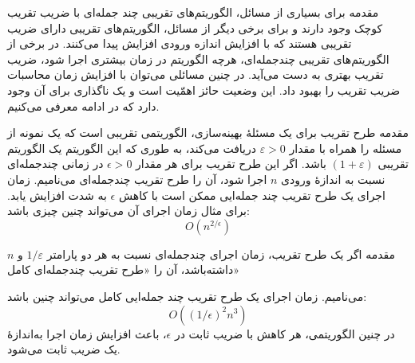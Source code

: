 \begin{itemframe}{مقدمه}
\itm
برای بسیاری از مسائل، الگوریتم‌های تقریبی چند جمله‌ای با ضریب تقریب کوچک وجود دارند و برای برخی دیگر از مسائل، الگوریتم‌های تقریبی دارای ضریب تقریبی هستند که با افزایش اندازه ورودی افزایش پیدا می‌کنند.
\itm
در برخی از الگوریتم‌های تقریبی چندجمله‌ای، هرچه الگوریتم در زمان بیشتری اجرا شود، ضریب تقریب بهتری به دست می‌آید. در چنین مسائلی می‌توان با افزایش زمان محاسبات ضریب تقریب را بهبود داد.
\itm
این وضعیت حائز اهمّیت است و یک ناگذاری برای آن وجود دارد که در ادامه معرفی می‌کنیم.
\end{itemframe}

\begin{itemframe}{مقدمه}
\itm
طرح تقریب
برای یک مسئلهٔ بهینه‌سازی، الگوریتمی تقریبی است که یک نمونه از مسئله را همراه با مقدار
$\varepsilon > 0$
دریافت می‌کند، به طوری که این الگوریتم یک الگوریتم تقریبی
$(1 + \varepsilon)$
 باشد.
\itm
اگر این طرح تقریب برای هر مقدار
$\epsilon > 0$
در زمانی چندجمله‌ای نسبت به اندازهٔ ورودی $n$ اجرا شود، آن را طرح تقریب چندجمله‌ای
 می‌نامیم.
\itm
زمان اجرای یک طرح تقریب چند جمله‌ایی ممکن است با کاهش
$\epsilon$
 به شدت افزایش یابد. برای مثال زمان اجرای آن می‌تواند چنین چیزی باشد:
$$
O(n^{2/\epsilon})
$$
\end{itemframe}


\begin{itemframe}{مقدمه}
\itm
اگر یک طرح تقریب، زمان اجرای چندجمله‌ای نسبت به هر دو پارامتر
$1/\varepsilon$
و $n$ داشته‌باشد، آن را «طرح تقریب چندجمله‌ای کامل»

می‌نامیم. زمان اجرای یک طرح تقریب چند جمله‌ایی کامل می‌تواند چنین باشد:
$$
O((1/\epsilon)^2n^3)
$$
\itm
در چنین الگوریتمی، هر کاهش با ضریب ثابت در $\epsilon$، باعث افزایش زمان اجرا به‌اندازهٔ یک ضریب ثابت می‌شود.
\end{itemframe}

